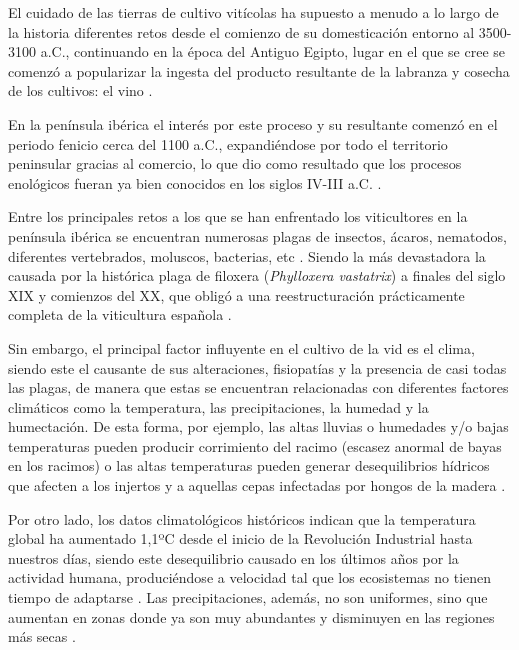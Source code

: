 El cuidado de las tierras de cultivo vitícolas ha supuesto a menudo a lo largo 
de la historia diferentes retos desde el comienzo de su domesticación entorno al 
3500-3100 a.C., continuando en la época del Antiguo Egipto, lugar en el que se cree se comenzó a popularizar la ingesta
del producto resultante de la labranza y cosecha de los cultivos: el vino \cite{book:piqueras2014}.

En la península ibérica el interés por este proceso y su resultante comenzó en el 
periodo fenicio cerca del 1100 a.C., expandiéndose por todo el territorio peninsular
gracias al comercio, lo que dio como resultado que los procesos enológicos fueran ya bien
conocidos en los siglos IV-III a.C. \cite{book:piqueras2014, MAPA:Historia}.

Entre los principales retos a los que se han enfrentado los viticultores en la península ibérica se 
encuentran numerosas plagas de insectos, ácaros, nematodos, diferentes vertebrados, moluscos, bacterias, etc \cite{book:mundi2004cap1}.
Siendo la más devastadora la causada por la histórica plaga de filoxera (\textit{Phylloxera vastatrix}) a 
finales del siglo XIX y comienzos del XX, que obligó a una reestructuración prácticamente completa de la viticultura española \cite{book:mundi2004cap3}.

Sin embargo, el principal factor influyente en el cultivo de la vid es el clima, siendo este el causante de sus alteraciones, fisiopatías y
la presencia de casi todas las plagas, de manera que estas se encuentran relacionadas con diferentes 
factores climáticos como la temperatura, las precipitaciones, la humedad y la humectación. 
De esta forma, por ejemplo, las altas lluvias o humedades y/o bajas temperaturas pueden producir corrimiento del racimo (escasez anormal de bayas en los racimos) o 
las altas temperaturas pueden generar desequilibrios hídricos que afecten a los injertos y a aquellas cepas infectadas por hongos de la madera \cite{book:mundi2004cap1}.

\clearpage

Por otro lado, los datos climatológicos históricos indican que la temperatura global ha aumentado 1,1ºC desde el 
inicio de la Revolución Industrial hasta nuestros días, siendo este desequilibrio causado en los últimos años
por la actividad humana, produciéndose a velocidad tal que los ecosistemas no tienen tiempo de adaptarse \cite{book:zuniga2021}.
Las precipitaciones, además, no son uniformes, sino que aumentan en zonas donde ya son muy abundantes y disminuyen
en las regiones más secas \cite{book:zuniga2021}.

